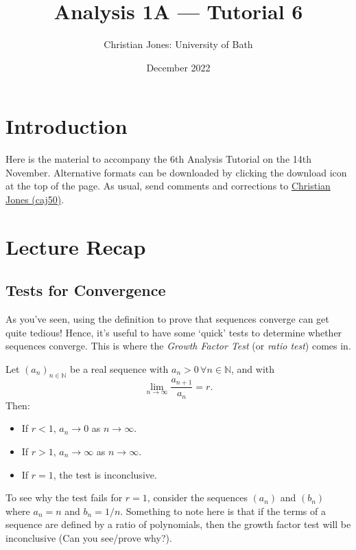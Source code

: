 \documentclass[
  12pt,
  a4paper]{extarticle}
\title{Analysis 1A --- Tutorial 6}
\author{Christian Jones: University of Bath}
\date{December 2022}
\providecommand{\tightlist}{%
  \setlength{\itemsep}{0pt}\setlength{\parskip}{0pt}}
\theoremstyle{plain}
\theoremstyle{plain}
\theoremstyle{plain}
\theoremstyle{plain}
\theoremstyle{plain}
\theoremstyle{definition}
\theoremstyle{definition}
\theoremstyle{definition}
\theoremstyle{remark}
\let\BeginKnitrBlock\begin \let\EndKnitrBlock\end
\renewcommand{\;}{\,}
\begin{document}
\maketitle

{
\setcounter{tocdepth}{2}
\tableofcontents
}
\newpage
{}

\hypertarget{introduction}{%
\section*{Introduction}\label{introduction}}

Here is the material to accompany the 6th Analysis Tutorial on the 14th November. Alternative formats can be downloaded by clicking the download icon at the top of the page. As usual, send comments and corrections to \href{mailto:caj50@bath.ac.uk}{Christian Jones (caj50)}.

\hypertarget{lecture-recap}{%
\section{Lecture Recap}\label{lecture-recap}}

\hypertarget{tests-for-convergence}{%
\subsection{Tests for Convergence}\label{tests-for-convergence}}

As you've seen, using the definition to prove that sequences converge can get quite tedious! Hence, it's useful to have some `quick' tests to determine whether sequences converge. This is where the \emph{Growth Factor Test} (or \emph{ratio test}) comes in.

\BeginKnitrBlock{theorem}[Growth Factor Test]
{\label{thm:thm1} }Let \((a_n)_{n\in\mathbb{N}}\) be a real sequence with \(a_n>0 \; \forall n\in\mathbb{N}\), and with \[\lim_{n\to\infty} \frac{a_{n+1}}{a_n} = r.\] Then:

\begin{itemize}
\tightlist
\item
  If \(r < 1\), \(a_n \to 0\) as \(n \to \infty\).
\item
  If \(r > 1\), \(a_n \to \infty\) as \(n \to \infty\).
\item
  If \(r = 1\), the test is inconclusive.
\end{itemize}
\EndKnitrBlock{theorem}

To see why the test fails for \(r = 1\), consider the sequences \((a_n)\) and \((b_n)\) where \(a_n = n\) and \(b_n = 1/n\). Something to note here is that if the terms of a sequence are defined by a ratio of polynomials, then the growth factor test will be inconclusive (Can you see/prove why?).
\end{document}
